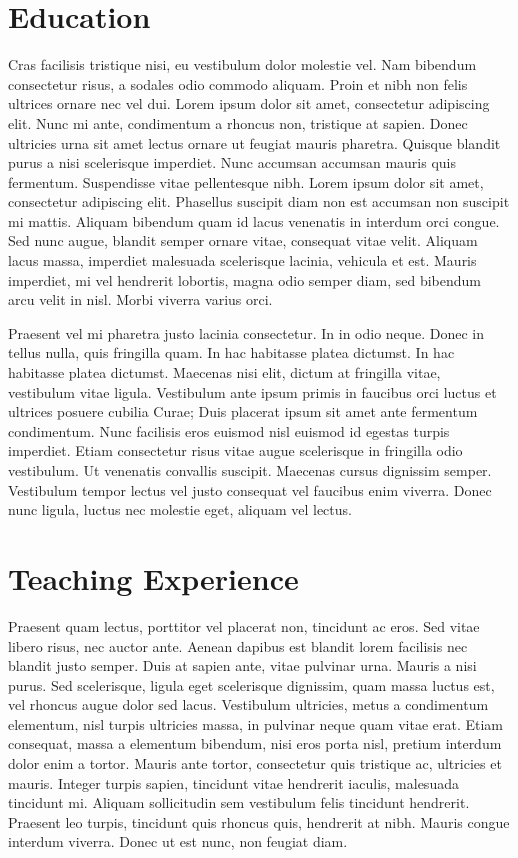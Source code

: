 \documentclass[letterpaper,11pt]{article}
\begin{document}
\section*{Education}
Cras facilisis tristique nisi, eu vestibulum dolor molestie vel. Nam
bibendum consectetur risus, a sodales odio commodo aliquam. Proin et
nibh non felis ultrices ornare nec vel dui. Lorem ipsum dolor sit
amet, consectetur adipiscing elit. Nunc mi ante, condimentum a rhoncus
non, tristique at sapien. Donec ultricies urna sit amet lectus ornare
ut feugiat mauris pharetra. Quisque blandit purus a nisi scelerisque
imperdiet. Nunc accumsan accumsan mauris quis fermentum. Suspendisse
vitae pellentesque nibh. Lorem ipsum dolor sit amet, consectetur
adipiscing elit. Phasellus suscipit diam non est accumsan non suscipit
mi mattis. Aliquam bibendum quam id lacus venenatis in interdum orci
congue. Sed nunc augue, blandit semper ornare vitae, consequat vitae
velit. Aliquam lacus massa, imperdiet malesuada scelerisque lacinia,
vehicula et est. Mauris imperdiet, mi vel hendrerit lobortis, magna
odio semper diam, sed bibendum arcu velit in nisl. Morbi viverra
varius orci.

Praesent vel mi pharetra justo lacinia consectetur. In in odio neque.
Donec in tellus nulla, quis fringilla quam. In hac habitasse platea
dictumst. In hac habitasse platea dictumst. Maecenas nisi elit, dictum
at fringilla vitae, vestibulum vitae ligula. Vestibulum ante ipsum
primis in faucibus orci luctus et ultrices posuere cubilia Curae; Duis
placerat ipsum sit amet ante fermentum condimentum. Nunc facilisis
eros euismod nisl euismod id egestas turpis imperdiet. Etiam
consectetur risus vitae augue scelerisque in fringilla odio
vestibulum. Ut venenatis convallis suscipit. Maecenas cursus dignissim
semper. Vestibulum tempor lectus vel justo consequat vel faucibus enim
viverra. Donec nunc ligula, luctus nec molestie eget, aliquam vel
lectus.

\section*{Teaching Experience}
Praesent quam lectus, porttitor vel placerat non, tincidunt ac eros.
Sed vitae libero risus, nec auctor ante. Aenean dapibus est blandit
lorem facilisis nec blandit justo semper. Duis at sapien ante, vitae
pulvinar urna. Mauris a nisi purus. Sed scelerisque, ligula eget
scelerisque dignissim, quam massa luctus est, vel rhoncus augue dolor
sed lacus. Vestibulum ultricies, metus a condimentum elementum, nisl
turpis ultricies massa, in pulvinar neque quam vitae erat. Etiam
consequat, massa a elementum bibendum, nisi eros porta nisl, pretium
interdum dolor enim a tortor. Mauris ante tortor, consectetur quis
tristique ac, ultricies et mauris. Integer turpis sapien, tincidunt
vitae hendrerit iaculis, malesuada tincidunt mi. Aliquam sollicitudin
sem vestibulum felis tincidunt hendrerit. Praesent leo turpis,
tincidunt quis rhoncus quis, hendrerit at nibh. Mauris congue interdum
viverra. Donec ut est nunc, non feugiat diam.
\end{document}

